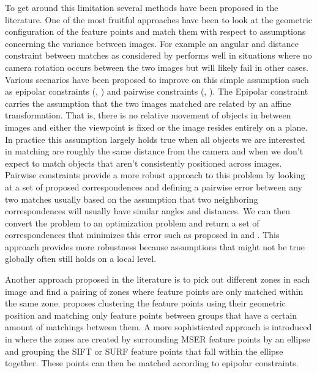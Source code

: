 \documentclass{article}
\begin{document}
To get around this limitation several methods have been proposed in the 
literature. One of the most fruitful approaches have been to look at the 
geometric configuration of the feature points and match them with 
respect to assumptions concerning the variance between images. For 
example an angular and distance constraint between matches as considered 
by \cite{kim2008efficient} performs well in situations where no camera 
rotation occurs between the two images but will likely fail in other 
cases. Various scenarios have been proposed to improve on this simple 
assumption such as epipolar constraints (\cite{torr2000mlesac}, 
\cite{chum2005matching}) and pairwise constraints 
(\cite{choi2009robust}, \cite{leordeanu2005spectral}). The Epipolar 
constraint carries the assumption that the two images matched are 
related by an affine transformation. That is, there is no relative 
movement of objects in between images and either the viewpoint is fixed 
or the image resides entirely on a plane. In practice this assumption 
largely holds true when all objects we are interested in matching are 
roughly the same distance from the camera and when we don't expect to 
match objects that aren't consistently positioned across images.  
Pairwise constraints provide a more robust approach to this problem by 
looking at a set of proposed correspondences and defining a pairwise 
error between any two matches usually based on the assumption that two 
neighboring correspondences will usually have similar angles and 
distances. We can then convert the problem to an optimization problem 
and return a set of correspondences that minimizes this error such as 
proposed in \cite{choi2009robust} and \cite{leordeanu2005spectral}.  
This approach provides more robustness because assumptions that might 
not be true globally often still holds on a local level.

Another approach proposed in the literature is to pick out different 
zones in each image and find a pairing of zones where feature points are 
only matched within the same zone. \cite{das2008event} proposes 
clustering the feature points using their geometric position and 
matching only feature points between groups that have a certain amount 
of matchings between them. A more sophisticated approach is introduced 
in \cite{wu2011robust} where the zones are created by surrounding MSER 
feature points by an ellipse and grouping the SIFT or SURF feature 
points that fall within the ellipse together. These points can then be 
matched according to epipolar constraints.
\end{document}
